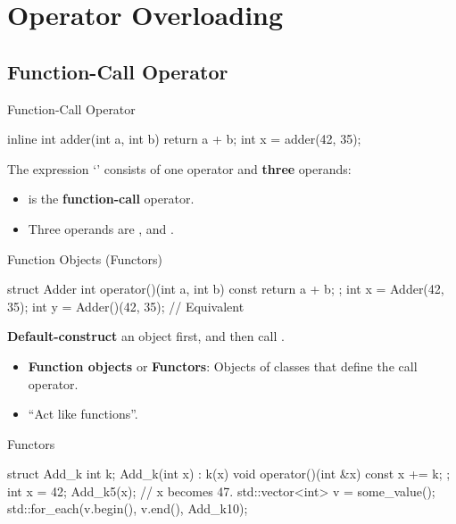 \section{Operator Overloading}

\subsection{Function-Call Operator}

\begin{frame}[fragile]{Function-Call Operator}
    \begin{cpp}
inline int adder(int a, int b) {
  return a + b;
}
int x = adder(42, 35);
    \end{cpp}
    The expression `' consists of one operator and \textbf{three} operands:
    \begin{itemize}
        \item \ttt{()} is the \textbf{function-call} operator.
        \item Three operands are ,  and .
    \end{itemize}
\end{frame}

\begin{frame}[fragile]{Function Objects (Functors)}
    \begin{cpp}
struct Adder {
  int operator()(int a, int b) const {
    return a + b;
  }
};
int x = Adder{}(42, 35);
int y = Adder()(42, 35); // Equivalent
    \end{cpp}
    \textbf{Default-construct} an  object first, and then call .
    \begin{itemize}
        \item \textbf{Function objects} or \textbf{Functors}: Objects of classes that define the call operator.
        \item ``Act like functions''.
    \end{itemize}
\end{frame}

\begin{frame}[fragile]{Functors}
    \begin{cpp}
struct Add_k {
  int k;
  Add_k(int x) : k(x) {}
  void operator()(int &x) const {
    x += k;
  }
};
int x = 42;
Add_k{5}(x); // x becomes 47.
std::vector<int> v = some_value();
std::for_each(v.begin(), v.end(), Add_k{10});
    \end{cpp}
\end{frame}

